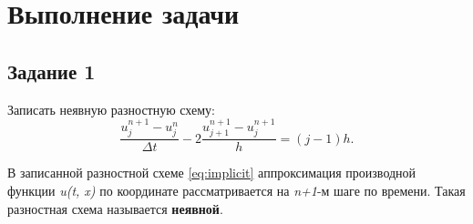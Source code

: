 \documentclass[12pt, a4paper]{report}
\begin{document}
	\section*{Выполнение задачи}

	\subsection*{Задание 1}
	\large
	Записать неявную разностную схему:
	\begin{equation}\label{eq:implicit}
		\frac{u_{j}^{n+1}-u_{j}^{n}}{\Delta t}-2\frac{u_{j+1}^{n+1}-u_{j}^{n+1}}{h}=(j-1)h.
	\end{equation}
	\par
	В записанной разностной схеме \eqref{eq:implicit} аппроксимация производной функции \textit{u(t, x)} по координате рассматривается на \textit{n+1}-м шаге по времени. Такая разностная схема называется \textbf{неявной}.
\end{document}
